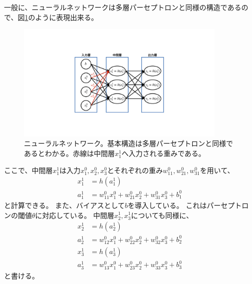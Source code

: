 一般に、ニューラルネットワークは多層パーセプトロンと同様の構造であるので、図\ref{6NeuralNetwork}のように表現出来る。

\begin{figure}[htbp]
 \centering
 \includegraphics[trim = 250 200 250 200, width=0.9\textwidth, clip]{Figure/2DeepLearning/6NeuralNetwork.png}
 \caption[ニューラルネットワーク]{ニューラルネットワーク。基本構造は多層パーセプトロンと同様であるとわかる。赤線は中間層$x^1_1$へ入力される重みである。}
 \label{6NeuralNetwork}
\end{figure}

ここで、中間層$x^1_1$は入力$x^0_1,x^0_2,x^0_3$とそれぞれの重み$w^0_{11},w^0_{21},w^0_{31}$を用いて、
\begin{equation}
 \begin{split}
  x^1_1 &= h(a^1_1)\\
  a^1_1 &= w^0_{11}x^0_1 + w^0_{21}x^0_2 + w^0_{31}x^0_3 + b^0_1
 \end{split}
\end{equation}
と計算できる。
また、バイアスとして$b$を導入している。
これはパーセプトロンの閾値$\theta$に対応している。
中間層$x^1_2,x^1_3$についても同様に、
\begin{equation}
 \begin{split}
  x^1_2 &= h(a^1_2)\\
  a^1_2 &= w^0_{12}x^0_1 + w^0_{22}x^0_2 + w^0_{32}x^0_3 + b^0_2\\
  x^1_3 &= h(a^1_3)\\
  a^1_3 &= w^0_{13}x^0_1 + w^0_{23}x^0_2 + w^0_{33}x^0_3 + b^0_3
 \end{split}
\end{equation}
と書ける。

